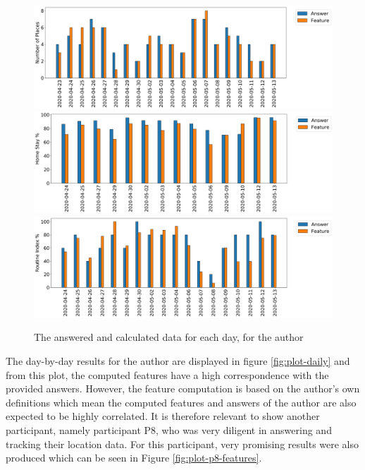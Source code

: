 \begin{figure}[h]
    \centering
    \includegraphics[width=\textwidth]{images/study/places_d6b2d9b9-398b-4e0d-b52b-224747f515c8.png}
    \includegraphics[width=\textwidth]{images/study/homestay_d6b2d9b9-398b-4e0d-b52b-224747f515c8.png}
    \includegraphics[width=\textwidth]{images/study/routine_d6b2d9b9-398b-4e0d-b52b-224747f515c8.png}
    \caption{The answered and calculated data for each day, for the author}
    \label{fig:plot-author-features}
\end{figure}

The day-by-day results for the author are displayed in figure \ref{fig:plot-daily} and from this plot, the computed features have a high correspondence with the provided answers. However, the feature computation is based on the author's own definitions which mean the computed features and answers of the author are also expected to be highly correlated. It is therefore relevant to show another participant, namely participant P8, who was very diligent in answering and tracking their location data. For this participant, very promising results were also produced which can be seen in Figure \ref{fig:plot-p8-features}.

